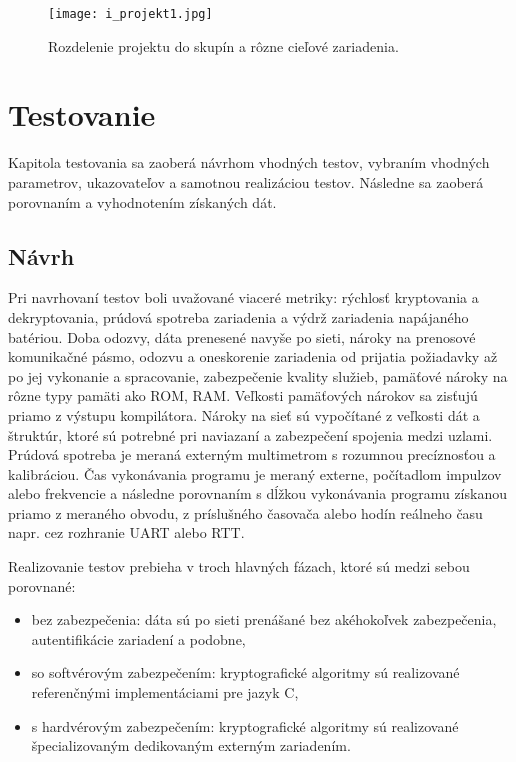 \documentclass[12pt,a4paper,oneside,openright]{report}
\begin{document}
	\begin{figure*}[h]
		\centering
		\texttt{[image: i\_projekt1.jpg]}
		\caption{Rozdelenie projektu do skupín a rôzne cieľové zariadenia.}
		\label{f:keil_project}
	\end{figure*}

\chapter{Testovanie} \label{s_testing}
Kapitola testovania sa zaoberá návrhom vhodných testov, vybraním vhodných parametrov, ukazovateľov a samotnou realizáciou testov. Následne sa zaoberá porovnaním a vyhodnotením získaných dát.

\section{Návrh}
Pri navrhovaní testov boli uvažované viaceré metriky: rýchlosť kryptovania a dekryptovania, prúdová spotreba zariadenia a výdrž zariadenia napájaného batériou. Doba odozvy, dáta prenesené navyše po sieti, nároky na prenosové komunikačné pásmo, odozvu a oneskorenie zariadenia od prijatia požiadavky až po jej vykonanie a spracovanie, zabezpečenie kvality služieb, pamäťové nároky na rôzne typy pamäti ako ROM, RAM.
Veľkosti pamäťových nárokov sa zisťujú priamo z výstupu kompilátora. Nároky na sieť sú vypočítané z veľkosti dát a štruktúr, ktoré sú potrebné pri naviazaní a zabezpečení spojenia medzi uzlami.
Prúdová spotreba je meraná externým multimetrom s rozumnou precíznosťou a kalibráciou.
Čas vykonávania programu je meraný externe, počítadlom impulzov alebo frekvencie a následne porovnaním s dĺžkou vykonávania programu získanou priamo z meraného obvodu, z príslušného časovača alebo hodín reálneho času napr. cez rozhranie UART alebo RTT.

Realizovanie testov prebieha v troch hlavných fázach, ktoré sú medzi sebou porovnané:
\singlespacing
\begin{itemize}
	\item bez zabezpečenia: dáta sú po sieti prenášané bez akéhokoľvek zabezpečenia, autentifikácie zariadení a podobne,
	\item so softvérovým zabezpečením: kryptografické algoritmy sú realizované referenčnými implementáciami pre jazyk C,
	\item s hardvérovým zabezpečením: kryptografické algoritmy sú realizované špecializovaným dedikovaným externým zariadením.
\end{itemize}
\onehalfspacing
\end{document}

